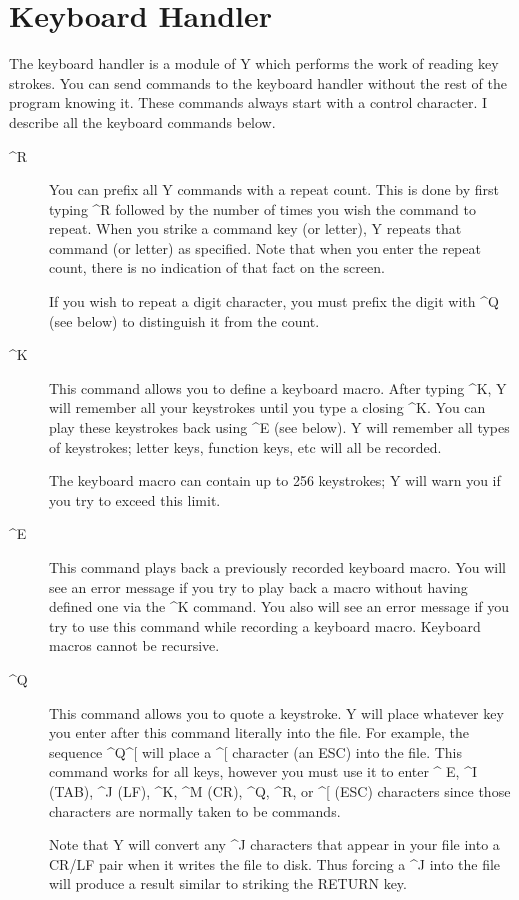 \section{Keyboard Handler}

The keyboard handler is a module of Y which performs the work of reading key strokes. You can
send commands to the keyboard handler without the rest of the program knowing it. These commands
always start with a control character. I describe all the keyboard commands below.

\begin{description}

\item[\textasciicircum R] You can prefix all Y commands with a repeat count. This is done by
  first typing \textasciicircum R followed by the number of times you wish the command to
  repeat. When you strike a command key (or letter), Y repeats that command (or letter) as
  specified. Note that when you enter the repeat count, there is no indication of that fact on
  the screen.

  If you wish to repeat a digit character, you must prefix the digit with \textasciicircum Q
  (see below) to distinguish it from the count.

\item[\textasciicircum K] This command allows you to define a keyboard macro. After typing
  \textasciicircum K, Y will remember all your keystrokes until you type a closing
  \textasciicircum K. You can play these keystrokes back using \textasciicircum E (see below). Y
  will remember all types of keystrokes; letter keys, function keys, etc will all be recorded.

  The keyboard macro can contain up to 256 keystrokes; Y will warn you if you try to exceed this
  limit.

\item[\textasciicircum E] This command plays back a previously recorded keyboard macro. You will
  see an error message if you try to play back a macro without having defined one via the
  \textasciicircum K command. You also will see an error message if you try to use this command
  while recording a keyboard macro. Keyboard macros cannot be recursive.

\item[\textasciicircum Q] This command allows you to quote a keystroke. Y will place whatever
  key you enter after this command literally into the file. For example, the sequence
  \textasciicircum Q\textasciicircum [ will place a \textasciicircum [ character (an ESC) into
  the file. This command works for all keys, however you must use it to enter \textasciicircum
  E, \textasciicircum I (TAB), \textasciicircum J (LF), \textasciicircum K, \textasciicircum M
  (CR), \textasciicircum Q, \textasciicircum R, or \textasciicircum [ (ESC) characters since
  those characters are normally taken to be commands.

  Note that Y will convert any \textasciicircum J characters that appear in your file into a
  CR/LF pair when it writes the file to disk. Thus forcing a \textasciicircum J into the file
  will produce a result similar to striking the RETURN key.

\end{description}
